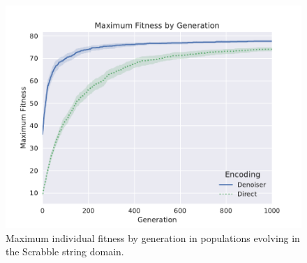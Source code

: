 \begin{figure}
  \includegraphics[width=0.8\linewidth]{img/scrabble_fit_vs_gen}
  \caption{
    Maximum individual fitness by generation in populations evolving in the Scrabble string domain.
  }\label{fig:scrabble_fit_vs_gen}
\end{figure}
